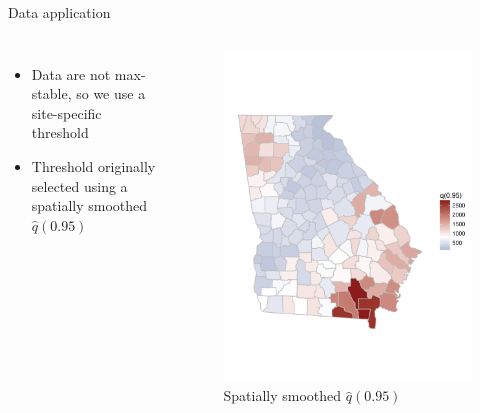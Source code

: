 \documentclass{beamer}
\begin{document}
\begin{frame}{Data application}
\begin{columns}[c]
  \begin{itemize} \setlength{\itemsep}{1em}
    \item Data are not max-stable, so we use a site-specific threshold
    \item Threshold originally selected using a spatially smoothed $\hat{q}(0.95)$
  \end{itemize}

  \begin{figure}[htbp]
      \centering
      \includegraphics[width=0.8\linewidth, trim = 0 10em 0 0 ]{plots/spatial-q95}
      \caption{Spatially smoothed $\hat{q}(0.95)$}
      \label{fig:thresh}
    \end{figure}
\end{columns}
\end{frame}
\end{document}
